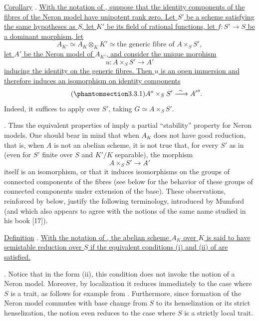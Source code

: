 \medskip
\noindent
\underline{Corollary} . \underline{With the notation of , suppose
that the identity components of the fibres of the Neron model have
unipotent rank zero.  Let $S'$ be a scheme satisfying the same hypotheses
as $S$, let $K'$ be its field of rational functions, let
$f:S'\longrightarrow S$ be a dominant morphism, let}
\[
 A_{K'}\simeq A_K\otimes_KK'
 \simeq \text{the generic fibre of }A\times_SS',
\]
\underline{let $A'$ be the Neron model of $A_{K'}$, and consider the unique
morphism}
\[
 u:A\times_SS'\longrightarrow A'
\]
\underline{inducing the identity on the generic fibres.  Then $u$ is an
open immersion and therefore induces an isomorphism on identity
components}
\begin{equation}\tag{\SGARefTarget{sga7.sga7i.eix.n3-3-1}{3.3.1}}
 A^o\times_SS'\xrightarrow{\ \sim\ }{A'}^o.
\end{equation}
Indeed, it suffices to apply  over $S'$, taking
$G\simeq A\times_SS'$.

\medskip
\noindent
{}.  Thus the equivalent properties of  imply a partial
``stability'' property for Neron models.  One should bear in mind that when
$A_K$ does not have good reduction, that is, when $A$ is not an abelian
scheme, it is not true that, for every $S'$ as in  (even for $S'$ finite
over $S$ and $K'/K$ separable), the morphism
\[
 A\times_SS'\longrightarrow A'
\]
itself is an isomorphism, or that it induces isomorphisms on the groups of
connected components of the fibres (see  below for the behavior of
these groups of connected components under extension of the base).  These
observations, reinforced by  below, justify the following terminology,
introduced by Mumford (and which also appears to agree with the notions of
the same name studied in his book [17]).

\medskip
\noindent
\underline{Definition} . \underline{With the notation of , the
abelian scheme $A_K$ over $K$ is said to have semistable reduction over $S$
if the equivalent conditions (i) and (ii) of  are satisfied.}

\medskip
\noindent
{}.  Notice that in the form (ii), this condition does not invoke the
notion of a Neron model.  Moreover, by localization it reduces immediately
to the case where $S$ is a trait, as follows for example from .
Furthermore, since formation of the Neron model commutes with base change
from $S$ to its henselization or its strict henselization, the notion even
reduces to the case where $S$ is a strictly local trait.
